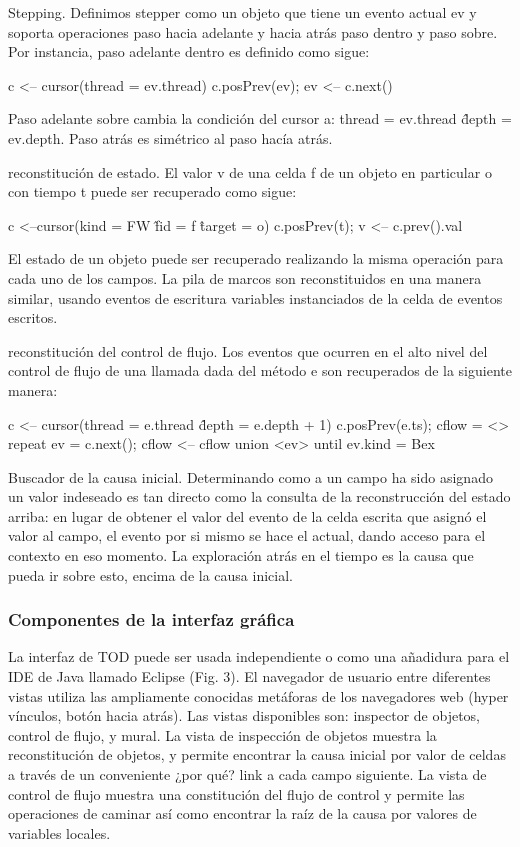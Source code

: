\documentclass[12pt,legalpaper]{report}
\begin{document}
Stepping.  Definimos stepper como un objeto que tiene un evento actual ev y soporta operaciones paso hacia adelante y hacia atrás paso dentro y paso sobre.  Por instancia, paso adelante dentro es definido como sigue:

	c <-- cursor(thread = ev.thread)
	c.posPrev(ev); ev <-- c.next()

	Paso adelante sobre cambia la condición del cursor a: thread = ev.thread \^ depth = ev.depth.  Paso atrás es simétrico al paso hacía atrás.

reconstitución de estado.  El valor v de una celda f de un objeto en particular o con tiempo t puede ser recuperado como sigue:

	c <--cursor(kind = FW \^ fid = f \^ target = o)
	c.posPrev(t); v <-- c.prev().val

El estado de un objeto puede ser recuperado realizando la misma operación para cada uno de los campos.  La pila de marcos son reconstituidos en una manera similar, usando eventos de escritura variables instanciados de la celda de eventos escritos.

reconstitución del control de flujo.  Los eventos que ocurren en el alto nivel del control de flujo de una llamada dada del método e  son recuperados de la siguiente manera:

	c <-- cursor(thread = e.thread \^ depth = e.depth + 1)
	c.posPrev(e.ts); cflow = <>
	repeat
		ev = c.next(); cflow <-- cflow union <ev>
	until ev.kind = Bex

Buscador de la causa inicial.  Determinando como a un campo ha sido asignado un valor indeseado es tan directo como la consulta de la reconstrucción del estado arriba:  en lugar de obtener el valor del evento de la celda escrita que asignó el valor al campo, el evento por si mismo se hace el actual, dando acceso para el contexto en eso momento.  La exploración atrás en el tiempo es la causa que pueda ir sobre esto, encima de la causa inicial.

			\subsubsection{Componentes de la interfaz gráfica}

	La interfaz de TOD puede ser usada independiente o como una añadidura para el IDE de Java llamado Eclipse (Fig. 3).  El navegador de usuario entre diferentes vistas utiliza las ampliamente conocidas metáforas de los navegadores web (hyper vínculos, botón hacia atrás).  Las vistas disponibles son:  inspector de objetos, control de flujo, y mural.  La vista de inspección de objetos muestra la reconstitución de objetos, y permite encontrar la causa inicial por valor de celdas a través de un conveniente ¿por qué? link a cada campo siguiente. La vista de control de flujo muestra una constitución del flujo de control y permite las operaciones de caminar así como encontrar la raíz de la causa por valores de variables locales.
\end{document}
